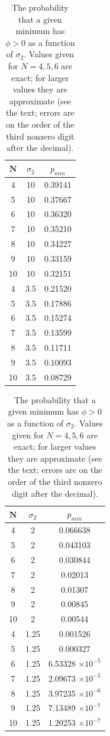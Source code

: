 \documentclass[12pt]{article}
\begin{document}
\begin{table}[h!] \label{Data}
  \begin{center}
    \caption{The probability that a given minimum has $\phi > 0$ as a function of $\sigma_2$. Values given for $N=4,5,6$ are exact; for larger values they are approximate (see the text; errors are on the order of the third nonzero digit after the decimal).}
    \label{tab:table1}
    \begin{tabular}{c|c|c} %
      $\textbf{N}$ & $\sigma_2$ & $p_{min}$\\
      \hline
      4 & 10 & 0.39141\\
      5 & 10 & 0.37667\\
      6 & 10 & 0.36320\\
      7 & 10 & 0.35210\\
      8 & 10 & 0.34227\\
      9 & 10 & 0.33159\\
      10 & 10 & 0.32151\\
      \hline
      4 & 3.5 & 0.21520\\
      5 & 3.5 & 0.17886\\
      6 & 3.5 & 0.15274\\
      7 & 3.5 & 0.13599\\
      8 & 3.5 & 0.11711\\
      9 & 3.5 & 0.10093\\
      10 & 3.5 & 0.08729\\
      \end{tabular}
      \quad
      \begin{tabular}{c|c|c} 
      $\textbf{N}$ & $\sigma_2$ & $p_{min}$\\
      \hline
      4 & 2 & 0.066638\\
      5 & 2 & 0.043103\\
      6 & 2 & 0.030844\\
      7 & 2 & 0.02013\\
      8 & 2 & 0.01307\\
      9 & 2 & 0.00845\\
      10 & 2 & 0.00544\\
      \hline
      4 & 1.25 & 0.001526\\
      5 & 1.25 & 0.000327\\
      6 & 1.25 & 6.53328 $\times 10^{-5}$\\
      7 & 1.25 & 2.09673 $\times 10^{-5}$ \\
      8 & 1.25 & 3.97235  $\times 10^{-6}$ \\
      9 & 1.25 & 7.13489  $\times 10^{-7}$ \\
      10 & 1.25 & 1.20253  $\times 10^{-7}$ \\
     \end{tabular}
  \end{center}
\end{table}
\end{document}
